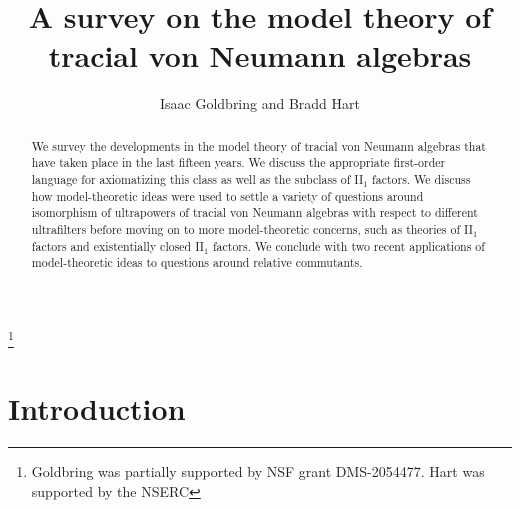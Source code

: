 \documentclass[12pt]{amsart}
\theoremstyle{definition}
\begin{document}

\title{A survey on the model theory of tracial von Neumann algebras}


\author{Isaac Goldbring and Bradd Hart}
\address{Department of Mathematics\\University of California, Irvine, 340 Rowland Hall (Bldg.\# 400),
Irvine, CA 92697-3875}
\thanks{Goldbring was partially supported by NSF grant DMS-2054477. Hart was supported by the NSERC}


\address{Department of Mathematics and Statistics, McMaster University, 1280 Main St., Hamilton ON, Canada L8S 4K1}

\maketitle

\begin{abstract}
We survey the developments in the model theory of tracial von Neumann algebras that have taken place in the last fifteen years.  We discuss the appropriate first-order language for axiomatizing this class as well as the subclass of II$_1$ factors.  We discuss how model-theoretic ideas were used to settle a variety of questions around isomorphism of ultrapowers of tracial von Neumann algebras with respect to different ultrafilters before moving on to more model-theoretic concerns, such as theories of II$_1$ factors and existentially closed II$_1$ factors.  We conclude with two recent applications of model-theoretic ideas to questions around relative commutants.
\end{abstract}

\section{Introduction}
\end{document}
